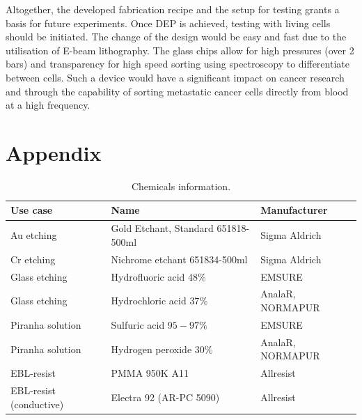 \documentclass[final]{jyflluk}
\begin{document}
Altogether, the developed fabrication recipe and the setup for testing grants a basis for future experiments. Once DEP is achieved, testing with living cells should be initiated. The change of the design would be easy and fast due to the utilisation of E-beam lithography. The glass chips allow for high pressures (over 2 bars) and transparency for high speed sorting using spectroscopy to differentiate between cells. Such a device would have a significant impact on cancer research and through the capability of sorting metastatic cancer cells directly from blood at a high frequency.


\nocite{*}

\printbibliography
\appendix

\section{Appendix}
\label{sec:chemicals}

\begin{table}[h]
    \centering
    \caption{Chemicals information.}
    \label{tab:chemicals}
    \begin{tabular}{||l l l||} \toprule
       \textbf{Use case}    & \textbf{Name} & \textbf{Manufacturer} \\ \midrule
       Au etching   & Gold Etchant, Standard 651818-500ml  &  Sigma Aldrich \\ \hline
       Cr etching  &  Nichrome etchant 651834-500ml  &  Sigma Aldrich \\\hline
       Glass etching  &  Hydrofluoric acid $48\percent$  &  EMSURE \\\hline
       Glass etching   &  Hydrochloric acid $37\percent$  & AnalaR, NORMAPUR \\\hline
       Piranha solution & Sulfuric acid $95-97\percent$ & EMSURE \\\hline
       Piranha solution & Hydrogen peroxide $30\percent$ & AnalaR, NORMAPUR \\\hline
       EBL-resist & PMMA 950K A11 & Allresist \\\hline
       EBL-resist (conductive) & Electra 92 (AR-PC 5090) & Allresist \\\hline
         \bottomrule
    \end{tabular}
 \end{table}
\end{document}
